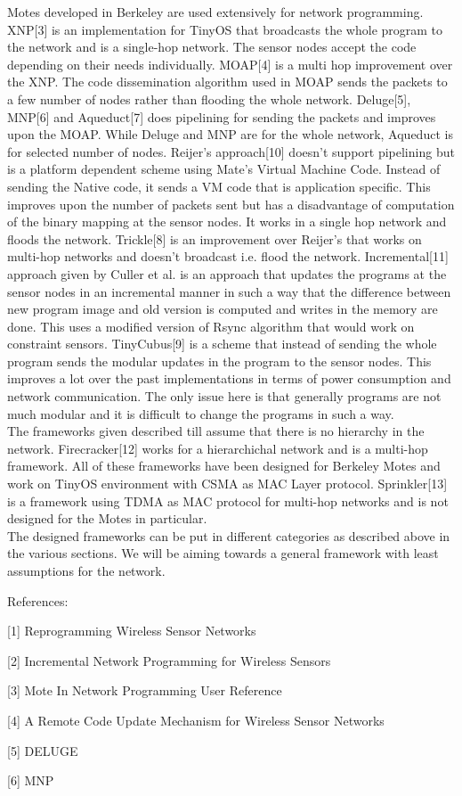 \documentclass[twocolumn]{article}
\begin{document}
Motes developed in Berkeley are used extensively for network programming. XNP[3] is an implementation for TinyOS that broadcasts the whole program to the network and is a single-hop network. The sensor nodes accept the code depending on their needs individually. MOAP[4] is a multi hop improvement over the XNP. The code dissemination algorithm used in MOAP sends the packets to a few number of nodes rather than flooding the whole network. Deluge[5], MNP[6] and Aqueduct[7] does pipelining for sending the packets and improves upon the MOAP. While Deluge and MNP are for the whole network, Aqueduct is for selected number of nodes. Reijer's approach[10] doesn't support pipelining but is a platform dependent scheme using Mate's Virtual Machine Code. Instead of sending the Native code, it sends a VM code that is application specific. This improves upon the number of packets sent but has a disadvantage of computation of the binary mapping at the sensor nodes. It works in a single hop network and floods the network. Trickle[8] is an improvement over Reijer's that works on multi-hop networks and doesn't broadcast i.e. flood the network. Incremental[11] approach given by Culler et al. is an approach that updates the programs at the sensor nodes in an incremental manner in such a way that the difference between new program image and old version is computed and writes in the memory are done. This uses a modified version of Rsync algorithm that would work on constraint sensors. TinyCubus[9] is a scheme that instead of sending the whole program sends the modular updates in the program to the sensor nodes. This improves a lot over the past implementations in terms of power consumption and network communication. The only issue here is that generally programs are not much modular and it is difficult to change the programs in such a way.
\\
The frameworks given described till assume that there is no hierarchy in the network. Firecracker[12] works for a hierarchichal network and is a multi-hop framework. All of these frameworks have been designed for Berkeley Motes and work on TinyOS environment with CSMA as MAC Layer protocol. Sprinkler[13] is a framework using TDMA as MAC protocol for multi-hop networks and is not designed for the Motes in particular.
\\
The designed frameworks can be put in different categories as described above in the various sections. We will be aiming towards a general framework with least assumptions for the network.



References:

[1] Reprogramming Wireless Sensor Networks

[2] Incremental Network Programming for Wireless Sensors

[3] Mote In Network Programming User Reference

[4] A Remote Code Update Mechanism for Wireless Sensor Networks

[5] DELUGE

[6] MNP
\end{document}
